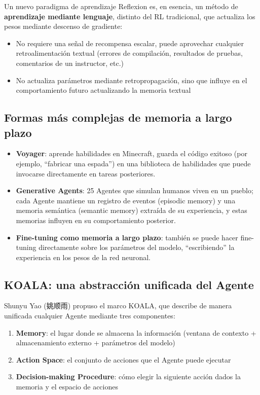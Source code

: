 \begin{knowledgebox}{Un nuevo paradigma de aprendizaje}
Reflexion es, en esencia, un método de \textbf{aprendizaje mediante lenguaje}, distinto del RL tradicional, que actualiza los pesos mediante descenso de gradiente:
\begin{itemize}
    \item No requiere una señal de recompensa escalar, puede aprovechar cualquier retroalimentación textual (errores de compilación, resultados de pruebas, comentarios de un instructor, etc.)
    \item No actualiza parámetros mediante retropropagación, sino que influye en el comportamiento futuro actualizando la memoria textual
\end{itemize}
\end{knowledgebox}

\subsection{Formas más complejas de memoria a largo plazo}

\begin{itemize}
    \item \textbf{Voyager}: aprende habilidades en Minecraft, guarda el código exitoso (por ejemplo, ``fabricar una espada'') en una biblioteca de habilidades que puede invocarse directamente en tareas posteriores.
    \item \textbf{Generative Agents}: 25 Agentes que simulan humanos viven en un pueblo; cada Agente mantiene un registro de eventos (episodic memory) y una memoria semántica (semantic memory) extraída de su experiencia, y estas memorias influyen en su comportamiento posterior.
    \item \textbf{Fine-tuning como memoria a largo plazo}: también se puede hacer fine-tuning directamente sobre los parámetros del modelo, ``escribiendo'' la experiencia en los pesos de la red neuronal.
\end{itemize}

\subsection{KOALA: una abstracción unificada del Agente}

Shunyu Yao (姚顺雨) propuso el marco KOALA, que describe de manera unificada cualquier Agente mediante tres componentes:

\begin{enumerate}
    \item \textbf{Memory}: el lugar donde se almacena la información (ventana de contexto + almacenamiento externo + parámetros del modelo)
    \item \textbf{Action Space}: el conjunto de acciones que el Agente puede ejecutar
    \item \textbf{Decision-making Procedure}: cómo elegir la siguiente acción dados la memoria y el espacio de acciones
\end{enumerate}

